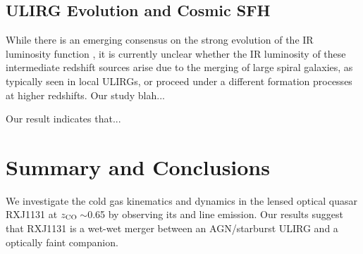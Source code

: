 \documentclass[]{emulateapj}
\begin{document}
\subsection{ULIRG Evolution and Cosmic SFH}
While there is an emerging consensus on the strong
evolution of the IR luminosity function \citep[\eg][]{Huynh07a,Seymour10a},
it is currently unclear whether the IR luminosity of
these intermediate redshift sources arise due to the merging of large spiral
galaxies, as typically seen in local ULIRGs, or proceed under a different
formation processes at higher redshifts. Our study blah...

Our result indicates that...

\section{Summary and Conclusions} \label{sec:sum}


We investigate the cold gas kinematics and dynamics in
the lensed optical quasar RXJ1131 at $z_{\rm CO}$\,$\sim$0.65
by observing its \bco and \cco line emission.
Our results suggest that RXJ1131 is a wet-wet merger between an AGN/starburst
ULIRG and a optically faint companion.


\end{document}
